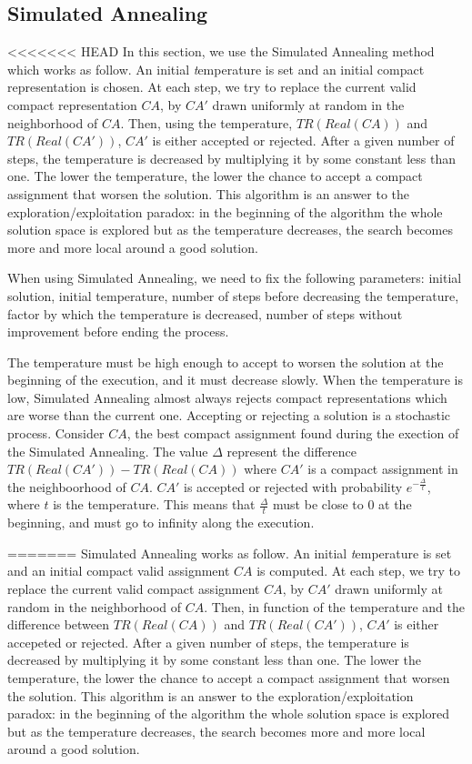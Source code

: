 \subsection{Simulated Annealing}\label{sec:recuit}

<<<<<<< HEAD
In this section, we use the Simulated Annealing method which works as follow. An initial {\emph temperature} is set and an initial compact representation is chosen. At each step, we try to replace the current valid compact representation $CA$, by $CA'$ drawn uniformly at random in the neighborhood of $CA$. Then, using the temperature, $TR(Real(CA))$ and $TR(Real(CA'))$, $CA'$ is either accepted or rejected. After a given number of steps, the temperature is decreased by multiplying it by some constant less than one. The lower the temperature, the lower the chance to accept a compact assignment that worsen the solution. This algorithm is an answer to the exploration/exploitation paradox: in the beginning of the algorithm the whole solution space is explored but as the temperature decreases, the search becomes more and more local around a good solution.

 When using Simulated Annealing, we need to fix the following parameters: initial solution, initial temperature, number of steps before decreasing the temperature, factor by which the temperature is decreased, number of steps without improvement before ending the process.

 The temperature must be high enough to accept to worsen the solution at the beginning of the execution, and it must decrease slowly. When the temperature is low, Simulated Annealing almost always rejects compact representations which are worse than the current one. Accepting or rejecting a solution is a stochastic process. Consider $CA$, the best compact assignment found during the exection of the Simulated Annealing. The value $\Delta$ represent the difference $TR(Real(CA'))-TR(Real(CA))$ where $CA'$ is a compact assignment in the neighboorhood of $CA$. $CA'$ is accepted or rejected with probability $e^{-\frac{\Delta}{t}} $, where $t$ is the temperature. This means that $\frac{\Delta}{t}$ must be close to $0$ at the beginning, and must go to infinity along the execution. 


=======
Simulated Annealing works as follow. An initial {\emph temperature} is set and an initial compact valid assignment $CA$ is computed. At each step, we try to replace the current valid compact assignment $CA$, by $CA'$ drawn uniformly at random in the neighborhood of $CA$. Then, in function of the temperature and the difference between $TR(Real(CA))$ and $TR(Real(CA'))$, $CA'$ is either accepeted or rejected. After a given number of steps, the temperature is decreased by multiplying it by some constant less than one. The lower the temperature, the lower the chance to accept a compact assignment that worsen the solution. This algorithm is an answer to the exploration/exploitation paradox: in the beginning of the algorithm the whole solution space is explored but as the temperature decreases, the search becomes more and more local around a good solution.


